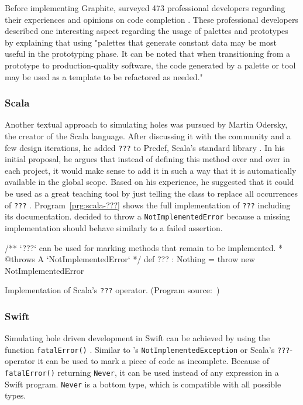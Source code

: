 Before implementing Graphite, \citeauthor{omar_active_2012} surveyed 473 professional developers regarding their experiences and opinions on code completion \cite{omar_active_2012}.
These professional developers described one interesting aspect regarding the usage of palettes and prototypes by explaining that using "palettes that generate constant data may be most useful in the prototyping phase. It can be noted that when transitioning from a prototype to production-quality software, the code generated by a palette or tool may be used as a template to be refactored as needed." \cite{omar_active_2012}

\subsubsection{Scala}
Another textual approach to simulating holes was pursued by Martin Odersky, the creator of the Scala language.
After discussing it with the community and a few design iterations, he added \texttt{???} to Predef, Scala's standard library \cite{odersky_adding_2011}.
In his initial proposal, he argues that instead of defining this method over and over in each project, it would make sense to add it in such a way that it is automatically available in the global scope.
Based on his experience, he suggested that it could be used as a great teaching tool by just telling the class to replace all occurrences of \texttt{???} \cite{odersky_adding_2011}.
Program~\ref{prg:scala-???} shows the full implementation of \texttt{???} including its documentation.
\citeauthor{odersky_adding_2011} decided to throw a \texttt{NotImplementedError} because a missing implementation should behave similarly to a failed assertion.
%
\begin{program}[ht]
\begin{GenericCode}
/** `???` can be used for marking methods that remain to be implemented.
* @throws A `NotImplementedError`
*/
def ??? : Nothing = throw new NotImplementedError
\end{GenericCode}
\caption{Implementation of Scala's \texttt{???} operator. (Program source:~\cite{odersky_adding_2011})}
\label{prg:scala-???}
\end{program}

\subsubsection{Swift}
Simulating hole driven development in Swift can be achieved by using the function \texttt{fatalError()} \cite{martinez_hole_2018}.
Similar to \CS's \texttt{NotImplementedException} or Scala's \texttt{???}-operator it can be used to mark a piece of code as incomplete.
Because of \texttt{fatalError()} returning \texttt{Never}, it can be used instead of any expression in a Swift program.
\texttt{Never} is a bottom type, which is compatible with all possible types.


